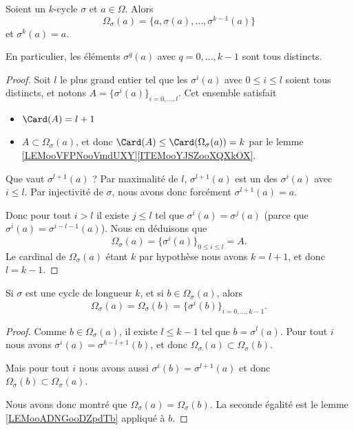 \begin{lemma}        \label{LEMooADNGooDZpdTb}
	Soient un \( k\)-cycle \( \sigma\) et \( a\in \Omega\). Alors
	\begin{equation}
		\Omega_{\sigma}(a)=\{ a,\sigma(a),\ldots, \sigma^{k-1}(a) \}
	\end{equation}
	et \( \sigma^k(a)=a\).

	En particulier, les éléments \( \sigma^q(a)\) avec \( q=0,\ldots, k-1\) sont tous distincts.
\end{lemma}

\begin{proof}
	Soit \( l\) le plus grand entier tel que les \( \sigma^i(a)\) avec \( 0\leq i\leq l\) soient tous distincts, et notons \( A=\{ \sigma^i(a) \}_{i=0,\ldots, l}\). Cet ensemble satisfait
	\begin{itemize}
		\item \( \Card(A)=l+1\)
		\item \( A\subset \Omega_{\sigma}(a)\), et donc \( \Card(A)\leq \Card(\Omega_{\sigma}(a))=k\) par le lemme \ref{LEMooVFPNooVmdUXY}\ref{ITEMooYJSZooXQXkOX}.
	\end{itemize}
	Que vaut \( \sigma^{l+1}(a)\) ? Par maximalité de \( l\), \( \sigma^{l+1}(a)\) est un des \( \sigma^i(a)\) avec \( i\leq l\). Par injectivité de \( \sigma\), nous avons donc forcément \( \sigma^{l+1}(a)=a\).

	Donc pour tout \( i>l\) il existe \( j\leq l\) tel que \( \sigma^i(a)=\sigma^j(a)\) (parce que \( \sigma^i(a)=\sigma^{i-l-1}(a)\)). Nous en déduisons que
	\begin{equation}
		\Omega_{\sigma}(a)=\{ \sigma^i(a) \}_{0\leq i\leq l}=A.
	\end{equation}
	Le cardinal de \( \Omega_{\sigma}(a)\) étant \( k\) par hypothèse nous avons \( k=l+1\), et donc \( l=k-1\).
\end{proof}

\begin{lemma}      \label{LEMooANVHooOQiTwY}
	Si \( \sigma\) est une cycle de longueur \( k\), et si \( b\in \Omega_{\sigma}(a)\), alors
	\begin{equation}
		\Omega_{\sigma}(a)=\Omega_{\sigma}(b)=\{ \sigma^i(b) \}_{i=0,\ldots, k-1}.
	\end{equation}
\end{lemma}

\begin{proof}
	Comme \( b\in \Omega_{\sigma}(a)\), il existe \( l\leq k-1\) tel que \( b=\sigma^l(a)\). Pour tout \( i\) nous avons \( \sigma^i(a)=\sigma^{k-l+1}(b)\), et donc \( \Omega_{\sigma}(a)\subset\Omega_{\sigma}(b)\).

	Mais pour tout \( i\) nous avons aussi \( \sigma^i(b)=\sigma^{l+1}(a)\) et donc \( \Omega_{\sigma}(b)\subset\Omega_{\sigma}(a)\).

	Nous avons donc montré que \( \Omega_{\sigma}(a)=\Omega_{\sigma}(b)\). La seconde égalité est le lemme \ref{LEMooADNGooDZpdTb} appliqué à \( b\).
\end{proof}


